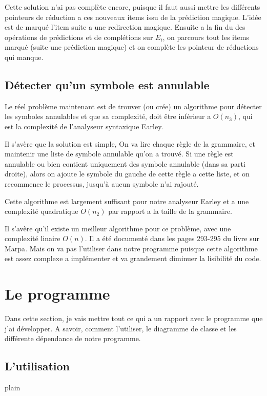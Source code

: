 \documentclass[10pt]{report}
\begin{document}
Cette solution n'ai pas complète encore, puisque il faut aussi mettre les différents pointeurs de réduction a ces nouveaux items issu de la prédiction magique. L'idée est de marqué l'item suite a une redirection magique. Ensuite a la fin du des opérations de prédictions et de complétions sur $E_i$, on parcours tout les items marqué (suite une prédiction magique) et on complète les pointeur de réductions qui manque.

\section{Détecter qu'un symbole est annulable}
Le réel problème maintenant est de trouver (ou crée) un algorithme pour détecter les symboles annulables et que sa complexité, doit être inférieur a $O(n_3)$, qui est la complexité de l'analyseur syntaxique Earley.

Il s'avère que la solution est simple, On va lire chaque règle de la grammaire, et maintenir une liste de symbole annulable qu'on a trouvé. Si une règle est annulable ou bien contient uniquement des symbole annulable (dans sa parti droite), alors on ajoute le symbole du gauche de cette règle a cette liste, et on recommence le processus, jusqu'à aucun symbole n'ai rajouté.

Cette algorithme est largement suffisant pour notre analyseur Earley et a une complexité quadratique $O(n_2)$ par rapport a la taille de la grammaire.

Il s'avère qu'il existe un meilleur algorithme pour ce problème, avec une complexité linaire $O(n)$. Il a été documenté dans les pages 293-295 du livre sur Marpa\cite{Marpa}. Mais on va pas l'utiliser dans notre programme puisque cette algorithme est assez complexe a implémenter et va grandement diminuer la lisibilité du code.

\chapter{Le programme}
Dans cette section, je vais mettre tout ce qui a un rapport avec le programme que j'ai développer. A savoir, comment l'utiliser, le diagramme de classe et les différente dépendance de notre programme.
\section{L'utilisation}

 {plain}
  
\end{document}
